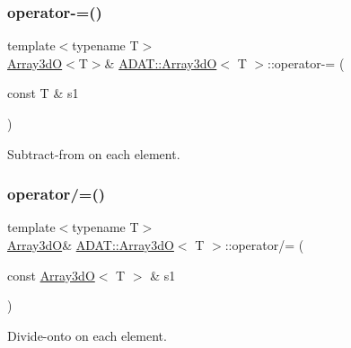\subsubsection{\texorpdfstring{operator-\/=()}{operator-=()}\hspace{0.1cm}{\footnotesize\ttfamily [6/6]}}
{\footnotesize\ttfamily template$<$typename T$>$ \\
\mbox{\hyperlink{classADAT_1_1Array3dO}{Array3dO}}$<$T$>$\& \mbox{\hyperlink{classADAT_1_1Array3dO}{A\+D\+A\+T\+::\+Array3dO}}$<$ T $>$\+::operator-\/= (\begin{DoxyParamCaption}\item[{const T \&}]{s1 }\end{DoxyParamCaption})\hspace{0.3cm}{\ttfamily [inline]}}



Subtract-\/from on each element. 

\mbox{\label{classADAT_1_1Array3dO_a634dcf5154efc0a7496d50f4f258978d}} 
\subsubsection{\texorpdfstring{operator/=()}{operator/=()}\hspace{0.1cm}{\footnotesize\ttfamily [1/6]}}
{\footnotesize\ttfamily template$<$typename T$>$ \\
\mbox{\hyperlink{classADAT_1_1Array3dO}{Array3dO}}\& \mbox{\hyperlink{classADAT_1_1Array3dO}{A\+D\+A\+T\+::\+Array3dO}}$<$ T $>$\+::operator/= (\begin{DoxyParamCaption}\item[{const \mbox{\hyperlink{classADAT_1_1Array3dO}{Array3dO}}$<$ T $>$ \&}]{s1 }\end{DoxyParamCaption})\hspace{0.3cm}{\ttfamily [inline]}}



Divide-\/onto on each element. 

\mbox{\label{classADAT_1_1Array3dO_a634dcf5154efc0a7496d50f4f258978d}} 
